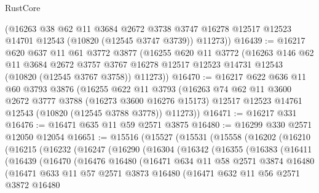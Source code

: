 \begin{lexlean}{RustCore}
\begin{coremodule}
      (@16263
        @38
        @62
        @11
        @3684
        @2672
        @3738
        @3747
        @16278
        @12517
        @12523
        @14701
        @12543
        (@10820 (@12545 @3747 @3739))
        @11273))
@16439 := @16217
    @620
    @637
    @11
    @61
    @3772
    @3877
    (@16255
      @620
      @11
      @3772
      (@16263
        @146
        @62
        @11
        @3684
        @2672
        @3757
        @3767
        @16278
        @12517
        @12523
        @14731
        @12543
        (@10820 (@12545 @3767 @3758))
        @11273))
@16470 := @16217
    @622
    @636
    @11
    @60
    @3793
    @3876
    (@16255
      @622
      @11
      @3793
      (@16263
        @74
        @62
        @11
        @3600
        @2672
        @3777
        @3788
        (@16273 @3600 @16276 @15173)
        @12517
        @12523
        @14761
        @12543
        (@10820 (@12545 @3788 @3778))
        @11273))
@16471 := @16217 @331
@16476 := @16471 @635 @11 @59 @2571 @3875
@16480 := @16299 @330 @2571 @12050 @12054
@16651 := @15516
    (@15527
      (@15531
        (@15558
          (@16202
            (@16210
              (@16215
                (@16232
                  (@16247
                    (@16290
                      (@16304
                        (@16342
                          (@16355
                            (@16383
                              (@16411
                                (@16439
                                  (@16470
                                    (@16476
                                      @16480
                                      (@16471
                                        @634
                                        @11
                                        @58
                                        @2571
                                        @3874
                                        @16480
                                        (@16471
                                          @633
                                          @11
                                          @57
                                          @2571
                                          @3873
                                          @16480
                                          (@16471
                                            @632
                                            @11
                                            @56
                                            @2571
                                            @3872
                                            @16480

\end{coremodule}
\end{lexlean}

